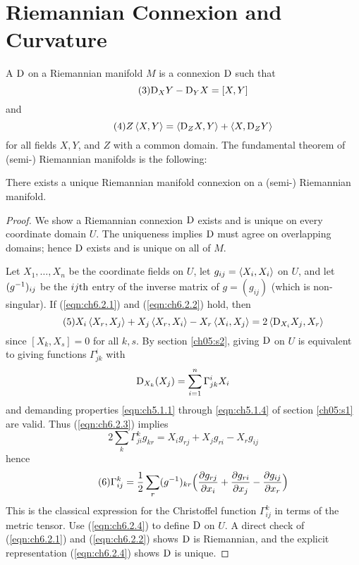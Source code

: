\documentclass[../main]{subfiles}
\begin{document}
\section{Riemannian Connexion and Curvature}\label{ch06:s2}

A  $\mathrm{D}$ on a Riemannian manifold $M$ is a connexion $\mathrm{D}$ such that
\begin{equation}\tag{3}\label{eqn:ch6.2.1}
    \mathrm{D}_XY-\mathrm{D}_YX=[X,Y]
\end{equation}
and
\begin{equation}\tag{4}\label{eqn:ch6.2.2}
    Z\left\langle X,Y\right\rangle = \left\langle\mathrm{D}_ZX,Y\right\rangle+\left\langle X,\mathrm{D}_ZY\right\rangle
\end{equation}
for all fields $X,Y$, and $Z$ with a common domain. The fundamental theorem of (semi-) Riemannian manifolds is the following:



\begin{theorem} \label{thm:ch6.2.1}
There exists a unique Riemannian manifold connexion on a (semi-) Riemannian manifold.
\end{theorem}

\begin{proof}
We show a Riemannian connexion $\mathrm{D}$ exists and is unique on every coordinate domain $U$. The uniqueness implies $\mathrm{D}$ must agree on overlapping domains; hence $\mathrm{D}$ exists and is unique on all of $M$.

Let $X_1,\ldots,X_n$ be the coordinate fields on $U$, let $g_{ij}=\left\langle X_i,X_i\right\rangle$ on $U$, and let $(g^{-1})_{ij}$ be the $ij\text{th}$ entry of the inverse matrix of $g=(g_{ij})$ (which is non-singular). If (\ref{eqn:ch6.2.1}) and (\ref{eqn:ch6.2.2}) hold, then
\begin{equation}\tag{5}\label{eqn:ch6.2.3}
    X_i\left\langle X_r,X_j\right\rangle+X_j\left\langle X_r,X_i\right\rangle-X_r\left\langle X_i,X_j\right\rangle = 2\left\langle\mathrm{D}_{X_i}X_j,X_r\right\rangle
\end{equation}
since $[X_k,X_s]=0$ for all $k,s$. By section \ref{ch05:s2}, giving $\mathrm{D}$ on $U$ is equivalent to giving functions $\Gamma_{jk}^i$ with
\[\mathrm{D}_{X_k}(X_j) = \sum_{i=1}^n \Gamma_{jk}^iX_i\]
and demanding properties \ref{eqn:ch5.1.1} through \ref{eqn:ch5.1.4} of section \ref{ch05:s1} are valid. Thus (\ref{eqn:ch6.2.3}) implies
\[2\sum_k\Gamma_{ji}^kg_{kr} = X_ig_{rj}+X_jg_{ri}-X_rg_{ij}\]
hence
\begin{equation}\tag{6} \label{eqn:ch6.2.4}
    \Gamma_{ij}^k = \frac12\sum_r(g^{-1})_{kr}\Big(\dfrac{\partial g_{rj}}{\partial x_i}+\dfrac{\partial g_{ri}}{\partial x_j}-\dfrac{\partial g_{ij}}{\partial x_r}\Big)
\end{equation}
This is the classical expression for the Christoffel function $\Gamma_{ij}^k$ in terms of the metric tensor. Use (\ref{eqn:ch6.2.4}) to define $\mathrm{D}$ on $U$. A direct check of (\ref{eqn:ch6.2.1}) and (\ref{eqn:ch6.2.2}) shows $\mathrm{D}$ is Riemannian, and the explicit representation (\ref{eqn:ch6.2.4}) shows $\mathrm{D}$ is unique.
\end{proof}
\end{document}
